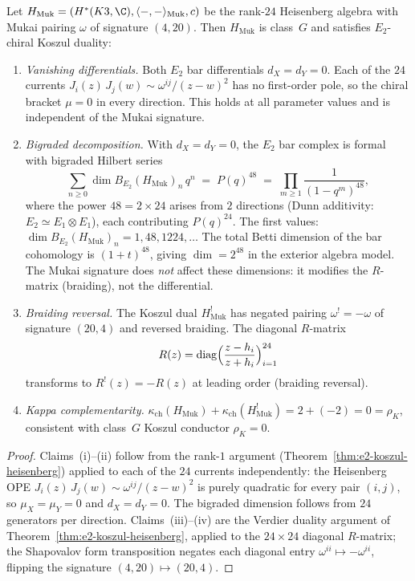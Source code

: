 \begin{theorem}
\label{thm:e2-koszul-k3}
Let $H_{\mathrm{Muk}} = (H^*(K3, \C), \langle -,- \rangle_{\mathrm{Muk}},
c)$ be the rank-$24$ Heisenberg algebra with Mukai pairing $\omega$ of
signature $(4,20)$. Then $H_{\mathrm{Muk}}$ is class~$G$ and satisfies
$E_2$-chiral Koszul duality:
\begin{enumerate}[label=\textup{(\roman*)}]
 \item \emph{Vanishing differentials.} Both $E_2$ bar differentials
 $d_X = d_Y = 0$. Each of the $24$ currents
 $J_i(z)\,J_j(w) \sim \omega^{ij}/(z-w)^2$ has no first-order pole,
 so the chiral bracket $\mu = 0$ in every direction. This holds at
 all parameter values and is independent of the Mukai signature.

 \item \emph{Bigraded decomposition.} With $d_X = d_Y = 0$, the $E_2$
 bar complex is formal with bigraded Hilbert series
 \[
 \sum_{n \geq 0} \dim B_{E_2}(H_{\mathrm{Muk}})_n \, q^n
 \;=\; P(q)^{48}
 \;=\; \prod_{m \geq 1} \frac{1}{(1-q^m)^{48}},
 \]
 where the power $48 = 2 \times 24$ arises from $2$ directions (Dunn
 additivity: $E_2 \simeq E_1 \otimes E_1$), each contributing $P(q)^{24}$.
 The first values: $\dim B_{E_2}(H_{\mathrm{Muk}})_n = 1, 48, 1224, \ldots$
 The total Betti dimension of the bar cohomology is
 $(1+t)^{48}$, giving $\dim = 2^{48}$ in the exterior algebra model.
 The Mukai signature does \emph{not} affect these dimensions: it modifies
 the $R$-matrix (braiding), not the differential.

 \item \emph{Braiding reversal.} The Koszul dual $H_{\mathrm{Muk}}^!$ has
 negated pairing $\omega^! = -\omega$ of signature $(20, 4)$ and reversed
 braiding. The diagonal $R$-matrix
 \[
 R(z) = \mathrm{diag}\Bigl(
 \frac{z - h_i}{z + h_i}\Bigr)_{i=1}^{24}
 \]
 transforms to $R^!(z) = -R(z)$ at leading order (braiding reversal).

 \item \emph{Kappa complementarity.}
 $\kappa_{\mathrm{ch}}(H_{\mathrm{Muk}}) +
 \kappa_{\mathrm{ch}}(H_{\mathrm{Muk}}^!) = 2 + (-2) = 0 = \rho_K$,
 consistent with class~$G$ Koszul conductor $\rho_K = 0$.
\end{enumerate}
\end{theorem}

\begin{proof}
Claims~(i)--(ii) follow from the rank-$1$ argument
(Theorem~\ref{thm:e2-koszul-heisenberg}) applied to each of the $24$
currents independently: the Heisenberg OPE
$J_i(z)\,J_j(w) \sim \omega^{ij}/(z-w)^2$ is purely quadratic for every
pair $(i,j)$, so $\mu_X = \mu_Y = 0$ and $d_X = d_Y = 0$. The bigraded
dimension follows from $24$ generators per direction.
Claims~(iii)--(iv) are the Verdier duality argument of
Theorem~\ref{thm:e2-koszul-heisenberg}, applied to the $24 \times 24$
diagonal $R$-matrix; the Shapovalov form transposition negates each
diagonal entry $\omega^{ii} \mapsto -\omega^{ii}$, flipping the signature
$(4,20) \mapsto (20,4)$.

\end{proof}

